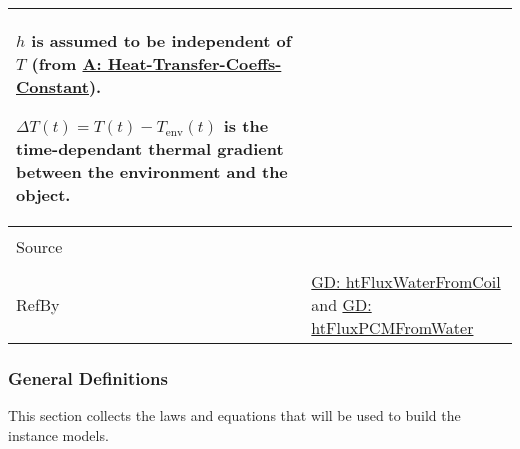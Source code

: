 \documentclass[12pt]{article}
\begin{document}
\begin{minipage}{\textwidth}
\begin{tabular}{>{\raggedright}p{}>{\raggedright\arraybackslash}p{}}
        $h$ is assumed to be independent of $T$ (from \hyperref[assumpHTCC]{A: Heat-Transfer-Coeffs-Constant}).
        
        $ΔT\left(t\right)=T\left(t\right)-{T_{\text{env}}}\left(t\right)$ is the time-dependant thermal gradient between the environment and the object.
        
\\ \midrule \\
Source & \cite[(pg. 8)]{incroperaEtAl2007}
         
\\ \midrule \\
RefBy & \hyperref[GD:htFluxWaterFromCoil]{GD: htFluxWaterFromCoil} and \hyperref[GD:htFluxPCMFromWater]{GD: htFluxPCMFromWater}
        
\\ \bottomrule
\end{tabular}
\end{minipage}
\subsubsection{General Definitions}
\label{Sec:GDs}
This section collects the laws and equations that will be used to build the instance models.
\end{document}
